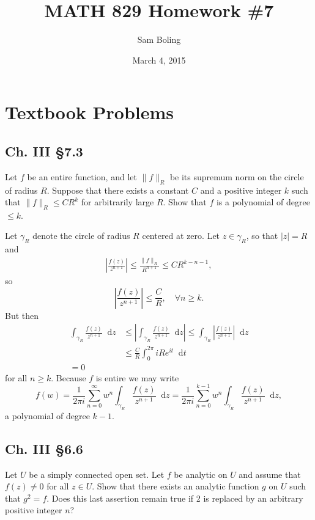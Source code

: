 \documentclass{article}
\title{MATH 829 Homework \#7}
\date{March 4, 2015}
\author{Sam Boling}
\newcommand\dif{\mathop{}\!\mathrm{d}}
\newcommand\horline{\noindent\makebox[\linewidth]{\rule{\textwidth}{0.4pt}}}
\newcounter{Problem}
\begin{document}
\begin{titlepage}
\maketitle
\end{titlepage}

\section{Textbook Problems}
\subsection*{Ch. III \S 7.3}
Let $f$ be an entire function, and let $\|f\|_R$ be its supremum
norm on the circle of radius $R$. Suppose that there exists a
constant $C$ and a positive integer $k$ such that
$\|f\|_R \leq C R^k$ for arbitrarily large $R$. Show that $f$ is a
polynomial of degree $\leq k$.

\horline

Let $\gamma_R$ denote the circle of radius $R$ centered at zero.
Let $z \in \gamma_R$, so that $|z| = R$ and
\begin{align*}
     \left|  
       \frac{f(z)}{z^{n+1}}
     \right|
\leq \frac{\|f\|_{R}}{R^{n+1}}
\leq C R^{k - n - 1},
\end{align*}
so
$$
     \left|
       \frac{f(z)}{z^{n+1}}
     \right|
\leq \frac{C}{R}, \quad
\forall n \geq k.
$$
But then
\begin{align*}
       \int_{\gamma_R}
         \frac{f(z)}{z^{n+1}}
         \dif z
& \leq \left|
         \int_{\gamma_R}
           \frac{f(z)}{z^{n+1}}
           \dif z
       \right|
  \leq \int_{\gamma_R}
       \left|
         \frac{f(z)}{z^{n+1}}         
       \right|
       \dif z \\
& \leq \frac{C}{R}
       \int_0^{2\pi}
         i R e^{i t}
         \dif t \\
   = 0
\end{align*}
for all $n \geq k$.
Because $f$ is entire we may write
$$
  f(w) 
= \frac{1}{2 \pi i}
  \sum_{n=0}^\infty 
    w^n
    \int_{\gamma_R}
      \frac{f(z)}{z^{n+1}}
      \dif z
= \frac{1}{2 \pi i}
  \sum_{n=0}^{k-1}
    w^n
    \int_{\gamma_R}
      \frac{f(z)}{z^{n+1}}
      \dif z,
$$
a polynomial of degree $k-1$.


\subsection*{Ch. III \S 6.6}
Let $U$ be a simply connected open set. Let $f$ be analytic on
$U$ and assume that $f(z) \neq 0$ for all $z \in U$. Show that there
exists an analytic function $g$ on $U$ such that $g^2 = f$. Does this
last assertion remain true if 2 is replaced by an arbitrary positive
integer $n$?
\end{document}
